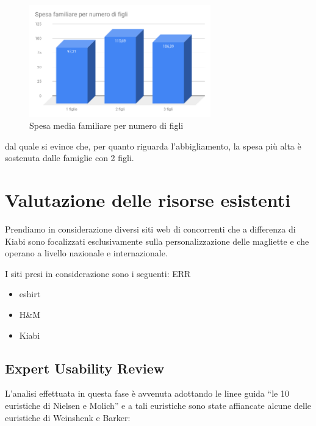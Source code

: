 \documentclass[12pt,italian,]{report}
\providecommand{\tightlist}{%
  \setlength{\itemsep}{0pt}\setlength{\parskip}{0pt}}
\begin{document}
\begin{figure}[h]
\centering
\includegraphics[width=0.7\textwidth,height=\textheight]{img/Spesa_familiare_per_numero_di_figli.png}
\caption{Spesa media familiare per numero di figli}
\end{figure}

dal quale si evince che, per quanto riguarda l'abbigliamento, la spesa
più alta è sostenuta dalle famiglie con 2 figli.

\hypertarget{valutazione-delle-risorse-esistenti}{%
\chapter{Valutazione delle risorse
esistenti}\label{valutazione-delle-risorse-esistenti}}

Prendiamo in considerazione diversi siti web di concorrenti che a
differenza di Kiabi sono focalizzati esclusivamente sulla
personalizzazione delle magliette e che operano a livello nazionale e
internazionale.

I siti presi in considerazione sono i seguenti: ERR

\begin{itemize}
\tightlist
\item eshirt
\item H\&M
\item Kiabi
\end{itemize}

\hypertarget{expert-usability-review}{%
\section{Expert Usability Review}\label{expert-usability-review}}

L'analisi effettuata in questa fase è avvenuta adottando le linee guida
``le 10 euristiche di Nielsen e Molich'' e a tali euristiche sono state
affiancate alcune delle euristiche di Weinshenk e Barker:
\end{document}
